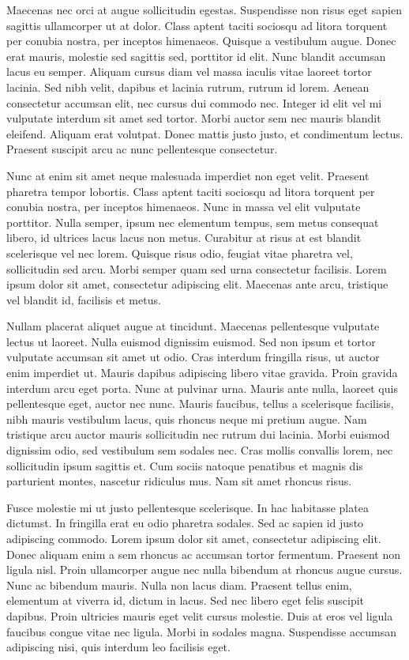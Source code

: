 Maecenas nec orci at augue sollicitudin egestas. Suspendisse non risus
eget sapien sagittis ullamcorper ut at dolor. Class aptent taciti
sociosqu ad litora torquent per conubia nostra, per inceptos himenaeos.
Quisque a vestibulum augue. Donec erat mauris, molestie sed sagittis
sed, porttitor id elit. Nunc blandit accumsan lacus eu semper. Aliquam
cursus diam vel massa iaculis vitae laoreet tortor lacinia. Sed nibh
velit, dapibus et lacinia rutrum, rutrum id lorem. Aenean consectetur
accumsan elit, nec cursus dui commodo nec. Integer id elit vel mi
vulputate interdum sit amet sed tortor. Morbi auctor sem nec mauris
blandit eleifend. Aliquam erat volutpat. Donec mattis justo justo,
et condimentum lectus. Praesent suscipit arcu ac nunc pellentesque
consectetur.

Nunc at enim sit amet neque malesuada imperdiet non eget velit. Praesent
pharetra tempor lobortis. Class aptent taciti sociosqu ad litora torquent
per conubia nostra, per inceptos himenaeos. Nunc in massa vel elit
vulputate porttitor. Nulla semper, ipsum nec elementum tempus, sem
metus consequat libero, id ultrices lacus lacus non metus. Curabitur
at risus at est blandit scelerisque vel nec lorem. Quisque risus odio,
feugiat vitae pharetra vel, sollicitudin sed arcu. Morbi semper quam
sed urna consectetur facilisis. Lorem ipsum dolor sit amet, consectetur
adipiscing elit. Maecenas ante arcu, tristique vel blandit id, facilisis
et metus.

Nullam placerat aliquet augue at tincidunt. Maecenas pellentesque
vulputate lectus ut laoreet. Nulla euismod dignissim euismod. Sed
non ipsum et tortor vulputate accumsan sit amet ut odio. Cras interdum
fringilla risus, ut auctor enim imperdiet ut. Mauris dapibus adipiscing
libero vitae gravida. Proin gravida interdum arcu eget porta. Nunc
at pulvinar urna. Mauris ante nulla, laoreet quis pellentesque eget,
auctor nec nunc. Mauris faucibus, tellus a scelerisque facilisis,
nibh mauris vestibulum lacus, quis rhoncus neque mi pretium augue.
Nam tristique arcu auctor mauris sollicitudin nec rutrum dui lacinia.
Morbi euismod dignissim odio, sed vestibulum sem sodales nec. Cras
mollis convallis lorem, nec sollicitudin ipsum sagittis et. Cum sociis
natoque penatibus et magnis dis parturient montes, nascetur ridiculus
mus. Nam sit amet rhoncus risus.

Fusce molestie mi ut justo pellentesque scelerisque. In hac habitasse
platea dictumst. In fringilla erat eu odio pharetra sodales. Sed ac
sapien id justo adipiscing commodo. Lorem ipsum dolor sit amet, consectetur
adipiscing elit. Donec aliquam enim a sem rhoncus ac accumsan tortor
fermentum. Praesent non ligula nisl. Proin ullamcorper augue nec nulla
bibendum at rhoncus augue cursus. Nunc ac bibendum mauris. Nulla non
lacus diam. Praesent tellus enim, elementum at viverra id, dictum
in lacus. Sed nec libero eget felis suscipit dapibus. Proin ultricies
mauris eget velit cursus molestie. Duis at eros vel ligula faucibus
congue vitae nec ligula. Morbi in sodales magna. Suspendisse accumsan
adipiscing nisi, quis interdum leo facilisis eget.

